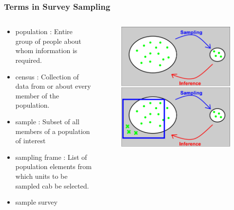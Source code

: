 \documentclass[10pt, compress]{beamer}
\begin{document}
\begin{frame}
    \frametitle{Terms in Survey Sampling}
    \begin{columns}
        \begin{block}{}
            \begin{itemize}
                \item population : Entire group of people about whom information
                is required.
                \item census : Collection of data from or about every member of
                the population.
                \item sample : Subset of all members of a population of interest
                \item sampling frame : List of population elements from which
                units to be sampled cab be selected.
                \item sample survey
            \end{itemize}
        \end{block}
        \begin{block}{}
            \begin{figure}
                \begin{center}
                    \includegraphics[scale=0.1]{img/PopulationFrame.png}
                \end{center}
            \end{figure}
        \end{block}
    \end{columns}
\end{frame}
\end{document}
